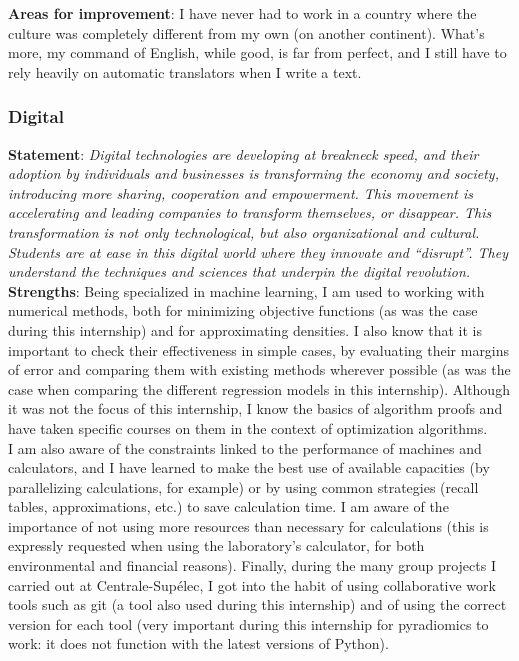 \documentclass[preprint,12pt]{elsarticle}
\begin{document}
\noindent \textbf{Areas for improvement}: I have never had to work in a country where the culture was completely different from my own (on another continent). What's more, my command of English, while good, is far from perfect, and I still have to rely heavily on automatic translators when I write a text.

\subsubsection{Digital}

\noindent \textbf{Statement}: \textit{Digital technologies are developing at breakneck speed, and their adoption by individuals and businesses is transforming the economy and society, introducing more sharing, cooperation and empowerment. This movement is accelerating and leading companies to transform themselves, or disappear. This transformation is not only technological, but also organizational and cultural. Students are at ease in this digital world where they innovate and “disrupt”. They understand the techniques and sciences that underpin the digital revolution.}\\[3 pt]

\noindent \textbf{Strengths}: Being specialized in machine learning, I am used to working with numerical methods, both for minimizing objective functions (as was the case during this internship) and for approximating densities. I also know that it is important to check their effectiveness in simple cases, by evaluating their margins of error and comparing them with existing methods wherever possible (as was the case when comparing the different regression models in this internship). Although it was not the focus of this internship, I know the basics of algorithm proofs and have taken specific courses on them in the context of optimization algorithms.\\
\indent I am also aware of the constraints linked to the performance of machines and calculators, and I have learned to make the best use of available capacities (by parallelizing calculations, for example) or by using common strategies (recall tables, approximations, etc.) to save calculation time. I am aware of the importance of not using more resources than necessary for calculations (this is expressly requested when using the laboratory's calculator, for both environmental and financial reasons). Finally, during the many group projects I carried out at Centrale-Supélec, I got into the habit of using collaborative work tools such as git (a tool also used during this internship) and of using the correct version for each tool (very important during this internship for pyradiomics to work: it does not function with the latest versions of Python).\\[3 pt]
\end{document}
